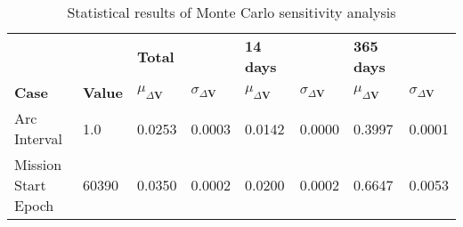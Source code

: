 \begin{table}[h!]
\centering
\begin{tabular}{llllllll}
 &  & \cellcolor[HTML]{EFEFEF}\textbf{Total} &  & \cellcolor[HTML]{EFEFEF}\textbf{14 days} & & \cellcolor[HTML]{EFEFEF}\textbf{365 days} \\
\rowcolor[HTML]{EFEFEF} 
\textbf{Case} & \textbf{Value} & \textbf{$\mu_{\Delta \boldsymbol{V}}$} & \textbf{$\sigma_{\Delta \boldsymbol{V}}$} & \textbf{$\mu_{\Delta \boldsymbol{V}}$} & \textbf{$\sigma_{\Delta \boldsymbol{V}}$} & \textbf{$\mu_{\Delta \boldsymbol{V}}$} & \textbf{$\sigma_{\Delta \boldsymbol{V}}$} \\ 
Arc Interval & 1.0 & 0.0253 & 0.0003 & 0.0142 & 0.0000 & 0.3997 & 0.0001 \\ 
Mission Start Epoch & 60390 & 0.0350 & 0.0002 & 0.0200 & 0.0002 & 0.6647 & 0.0053 \\ 
\end{tabular}
\caption{Statistical results of Monte Carlo sensitivity analysis}
\label{tab:SensitivityAnalysis}
\end{table}